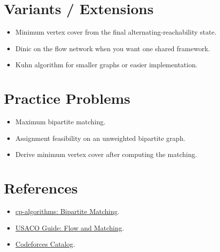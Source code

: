 \section*{Variants / Extensions}

\begin{itemize}
  \item Minimum vertex cover from the final alternating-reachability state.
  \item Dinic on the flow network when you want one shared framework.
  \item Kuhn algorithm for smaller graphs or easier implementation.
\end{itemize}

\section*{Practice Problems}

\begin{itemize}
  \item Maximum bipartite matching.
  \item Assignment feasibility on an unweighted bipartite graph.
  \item Derive minimum vertex cover after computing the matching.
\end{itemize}

\section*{References}

\begin{itemize}
  \item \href{https://cp-algorithms.com/graph/kuhn_maximum_bipartite_matching.html}{cp-algorithms: Bipartite Matching}.
  \item \href{https://usaco.guide/plat/flow?lang=cpp}{USACO Guide: Flow and Matching}.
  \item \href{https://codeforces.com/catalog}{Codeforces Catalog}.
\end{itemize}
